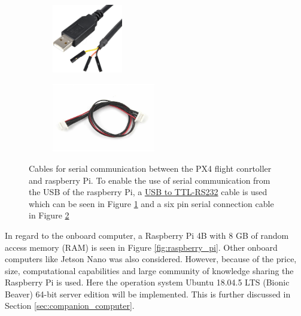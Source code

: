 \documentclass[../Head/report.tex]{subfiles}
\begin{document}
\begin{figure}[H]
    \centering
    \hspace{-4.0em}
    \begin{subfigure}[b]{.3\textwidth}
        \centering
        \includegraphics[height=3cm]{../Figures/raspberry_pi/usb-TTL_232R_Raspberry_Pi_debug.png}
        \caption{}
        \label{fig:usb-TTL_232R_Raspberry_Pi_debug}
    \end{subfigure}
    \begin{subfigure}[b]{.25\textwidth}
        \centering
        \includegraphics[height=3cm]{../Figures/raspberry_pi/holybro-pixhawk-4-mini-uart-cable.jpg}
        \caption{}
        \label{fig:six_pin_serial_connection_cable}
    \end{subfigure}
    \caption{Cables for serial communication between the PX4 flight conrtoller and raspberry Pi. To enable the use of serial communication from the USB of the raspberry Pi, a \href{https://raspberrypi.dk/en/product/usb-to-ttl-rs232-debug-cable-for-raspberry-pi/}{USB to TTL-RS232} cable is used which can be seen in Figure \ref{fig:usb-TTL_232R_Raspberry_Pi_debug} and a six pin serial connection cable in Figure \ref{fig:six_pin_serial_connection_cable}}
    \label{fig:pixhawk_mini_four}
\end{figure}

In regard to the onboard computer, a Raspberry Pi 4B with 8 GB of random access memory (RAM) is seen in Figure \ref{fig:raspberry_pi}. Other onboard computers like Jetson Nano was also considered. However, because of the price, size, computational capabilities and large community of knowledge sharing the Raspberry Pi is used. Here the operation system Ubuntu 18.04.5 LTS (Bionic Beaver) 64-bit server edition will be implemented. This is further discussed in Section \ref{sec:companion_computer}.
\end{document}
